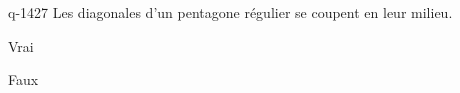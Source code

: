 \begin{truefalse}{q-1427}
Les diagonales d'un pentagone régulier se coupent en leur milieu.
\item Vrai
\item* Faux
\end{truefalse}

